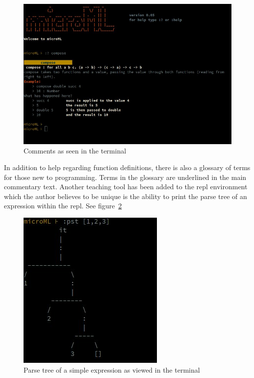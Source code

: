 \documentclass[12pt, a4paper]{report}
\begin{document}
\begin{figure}
    \includegraphics[scale=0.4]{images/comment.jpg}
    {\caption{Comments as seen in the terminal}}
    \label{fig:comments}
\end{figure}

In addition to help regarding function definitions, there is also a glossary of terms for those new
to programming. Terms in the glossary are underlined in the main commentary text.  Another teaching 
tool has been added to the repl environment which the author believes to be unique
is the ability to print the parse tree of an expression within the repl. See figure~\ref{fig:tree}

\begin{figure}
    \includegraphics[scale=0.6]{images/tree.jpg}
    {\caption{Parse tree of a simple expression as viewed in the terminal}}
    \label{fig:tree}
\end{figure}
\end{document}
